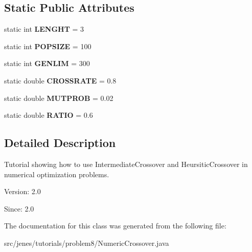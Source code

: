 \subsection*{Static Public Attributes}
\begin{CompactItemize}
\item 
\hypertarget{classjenes_1_1tutorials_1_1problem8_1_1_numeric_crossover_f73d636c488b92bf3ae33d19d1f5f5e7}{
static int \textbf{LENGHT} = 3}
\label{classjenes_1_1tutorials_1_1problem8_1_1_numeric_crossover_f73d636c488b92bf3ae33d19d1f5f5e7}

\item 
\hypertarget{classjenes_1_1tutorials_1_1problem8_1_1_numeric_crossover_0a9b3b839ab6677dcbae723434df6551}{
static int \textbf{POPSIZE} = 100}
\label{classjenes_1_1tutorials_1_1problem8_1_1_numeric_crossover_0a9b3b839ab6677dcbae723434df6551}

\item 
\hypertarget{classjenes_1_1tutorials_1_1problem8_1_1_numeric_crossover_5e45487dcf5730d7c628ca85b21160dc}{
static int \textbf{GENLIM} = 300}
\label{classjenes_1_1tutorials_1_1problem8_1_1_numeric_crossover_5e45487dcf5730d7c628ca85b21160dc}

\item 
\hypertarget{classjenes_1_1tutorials_1_1problem8_1_1_numeric_crossover_e4fcf3a595e386c6aeec443dedaba83f}{
static double \textbf{CROSSRATE} = 0.8}
\label{classjenes_1_1tutorials_1_1problem8_1_1_numeric_crossover_e4fcf3a595e386c6aeec443dedaba83f}

\item 
\hypertarget{classjenes_1_1tutorials_1_1problem8_1_1_numeric_crossover_4d0587e4b39b1f74efd20a0c921c38f7}{
static double \textbf{MUTPROB} = 0.02}
\label{classjenes_1_1tutorials_1_1problem8_1_1_numeric_crossover_4d0587e4b39b1f74efd20a0c921c38f7}

\item 
\hypertarget{classjenes_1_1tutorials_1_1problem8_1_1_numeric_crossover_e3c1d4871321a6323d09add505679fe0}{
static double \textbf{RATIO} = 0.6}
\label{classjenes_1_1tutorials_1_1problem8_1_1_numeric_crossover_e3c1d4871321a6323d09add505679fe0}

\end{CompactItemize}


\subsection{Detailed Description}
Tutorial showing how to use IntermediateCrossover and HeursiticCrossover in numerical optimization problems.

\begin{Desc}
\item[Version:]2.0 \end{Desc}
\begin{Desc}
\item[Since:]2.0 \end{Desc}


The documentation for this class was generated from the following file:\begin{CompactItemize}
\item 
src/jenes/tutorials/problem8/NumericCrossover.java\end{CompactItemize}
